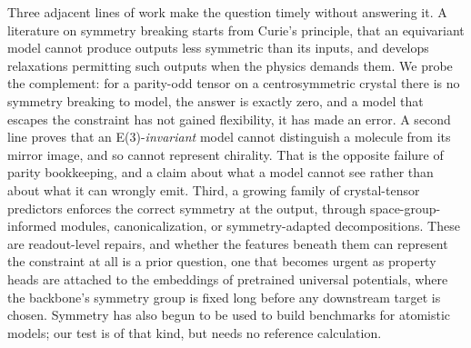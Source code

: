 Three adjacent lines of work make the question timely without answering it. A literature on symmetry breaking starts from Curie's principle\cite{curie1894symmetry}, that an equivariant model cannot produce outputs less symmetric than its inputs, and develops relaxations permitting such outputs when the physics demands them\cite{smidt2021symmetry,xie2024symmetrybreaking,kaba2023symmetry,prob2025symmetry}. We probe the complement: for a parity-odd tensor on a centrosymmetric crystal there is no symmetry breaking to model, the answer is exactly zero, and a model that escapes the constraint has not gained flexibility, it has made an error. A second line proves that an E(3)-\emph{invariant} model cannot distinguish a molecule from its mirror image, and so cannot represent chirality\cite{dumitrescu2024chirality}. That is the opposite failure of parity bookkeeping, and a claim about what a model cannot see rather than about what it can wrongly emit. Third, a growing family of crystal-tensor predictors enforces the correct symmetry at the output, through space-group-informed modules, canonicalization, or symmetry-adapted decompositions\cite{yan2024gmtnet,goectp2024,lu2025eatgnn,piezotensornet2024,ceitnet2026}. These are readout-level repairs, and whether the features beneath them can represent the constraint at all is a prior question, one that becomes urgent as property heads are attached to the embeddings of pretrained universal potentials\cite{hung2024dielectric}, where the backbone's symmetry group is fixed long before any downstream target is chosen. Symmetry has also begun to be used to build benchmarks for atomistic models\cite{parackal2026symmetry}; our test is of that kind, but needs no reference calculation.

